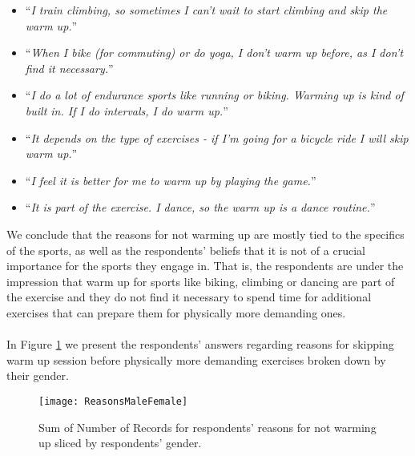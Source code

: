\begin{itemize}
\item ``\textit{I train climbing, so sometimes I can't wait to start climbing and skip the warm up.}''
 \item ``\textit{When I bike (for commuting) or do yoga, I don't warm up before, as I don't find it necessary.}''
\item ``\textit{I do a lot of endurance sports like running or biking. Warming up is kind of built in. If I do intervals, I do warm up.}''
\item ``\textit{It depends on the type of exercises - if I'm going for a bicycle ride I will skip warm up.}''
\item ``\textit{I feel it is better for me to warm up by playing the game.}''
\item ``\textit{It is part of the exercise. I dance, so the warm up is a dance routine.}''
\end{itemize}
We conclude that the reasons for not warming up are mostly tied to the specifics of the sports, as well as the respondents' beliefs that it is not of a crucial importance for the sports they engage in. That is, the respondents are under the impression that warm up for sports like biking, climbing or dancing are part of the exercise and they do not find it necessary to spend time for additional exercises that can prepare them for physically more demanding ones.\\ \\
In Figure \ref{fig:ReasonsMaleFemale} we present the respondents' answers regarding reasons for skipping warm up session before physically more demanding exercises broken down by their gender.\\
\begin{figure}[h]
    \centering
    \texttt{[image: ReasonsMaleFemale]}
    \caption[Reasons for not warming up.]{Sum of Number of Records for respondents' reasons for not warming up sliced by respondents' gender.}
    \label{fig:ReasonsMaleFemale}
\end{figure}\\
